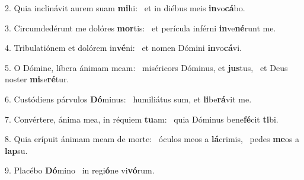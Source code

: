 2. Quia inclinávit aurem suam \textbf{mi}hi: \ast\  et in diébus meis \textbf{in}vo\textbf{cá}bo.\

3. Circumdedérunt me dolóres \textbf{mor}tis: \ast\  et perícula inférni \textbf{in}ve\textbf{né}runt me.\

4. Tribulatiónem et dolórem in\textbf{vé}ni: \ast\  et nomen Dómini \textbf{in}vo\textbf{cá}vi.\

5. O Dómine, líbera ánimam meam: \dag\  miséricors Dóminus, et \textbf{jus}tus, \ast\  et Deus noster \textbf{mi}se\textbf{ré}tur.\

6. Custódiens párvulos \textbf{Dó}minus: \ast\  humiliátus sum, et \textbf{li}be\textbf{rá}vit me.\

7. Convértere, ánima mea, in réquiem \textbf{tu}am: \ast\  quia Dóminus bene\textbf{fé}cit \textbf{ti}bi.\

8. Quia erípuit ánimam meam de morte: \dag\  óculos meos a \textbf{lá}crimis, \ast\  pedes \textbf{me}os a \textbf{lap}su.\

9. Placébo \textbf{Dó}mino \ast\  in regi\textbf{ó}ne vi\textbf{vó}rum.\

